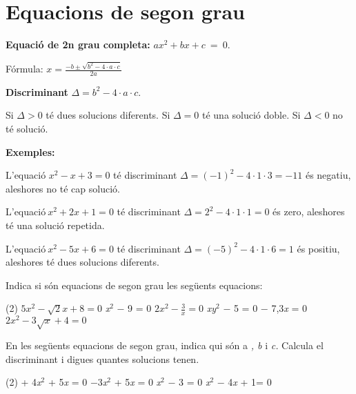 \section{Equacions de segon grau}

\begin{theorybox}
	\begin{multicols}{2}
		\centering
 \end{multicols}
 
 \textbf{ Equació de 2n grau completa: } $ax^2+bx+c\ =\ 0$.  
 \begin{center}
 Fórmula: $\boxed{ x=\frac{-b\pm \sqrt{b^2-4\cdot  a\cdot  c}}{2a} }$
 \end{center}
  \textbf{Discriminant} $\Delta =b^2-4\cdot a \cdot c$. 
 
 Si $\Delta >0$ té dues solucions diferents. Si $\Delta =0$ té una solució doble. Si $\Delta <0$ no té solució.
 
 \textbf{Exemples:}
 
 L'equació $x^2-x+3=0$ té discriminant $\Delta ={(-1)}^2-4\cdot1\cdot3=-11$ és negatiu, aleshores no té cap solució.
 
 L'equació${\ x}^2+2x+1=0$ té discriminant $\Delta =2^2-4\cdot1\cdot1=0$  és zero, aleshores té una solució repetida.
 
 L'equació${\ x}^2-5x+6=0$ té discriminant $\Delta ={(-5)}^2-4\cdot1\cdot6=1$  és positiu, aleshores té dues solucions diferents.
 

\end{theorybox}


\begin{mylist}
\exer  \mental Indica si són equacions de segon grau les següents equacions:
\begin{tasks}(2)
 \task $5x^{2} -\sqrt{2} x+8=0$  \textit{x}${}^{2}$ $-$ 9 = 0   \task  $2x^{2} -\frac{3}{x} =0$ 
\textit{xy}${}^{2}$ $-$ 5 = 0     $-$ 7,3\textit{x} = 0   \task  $2x^{2} -3\sqrt{x} +4=0$
 \end{tasks}


\exer  En les següents equacions de segon grau, indica qui són a \textit{, b} i \textit{c. }Calcula el discriminant i digues quantes solucions tenen.

\begin{tasks}(2) 
	 + 4\textit{x}${}^{2}$ + 5\textit{x} = 0   
	\task  $-$3\textit{x}${}^{2}$ + 5\textit{x} = 0   
	\textit{x}${}^{2}$ $-$ 3 = 0   
	\textit{x}${}^{2}$ $-$ 4\textit{x} + 1= 0
\end{tasks}

\answers{[ $a=4$, $b=5$ i $c=3$; $\Delta=-23<0$; Cap solució,
			$a=-3$, $b=5$ i $c=0$; $\Delta=5>0$; Dues solucions,
		$a=2$, $b=0$ i $c=-3$; $\Delta=24$; Dues solucions,
		$a=4$, $b=-4$ i $c=1$; $\Delta=0$; Una solució doble]}

\end{mylist}

